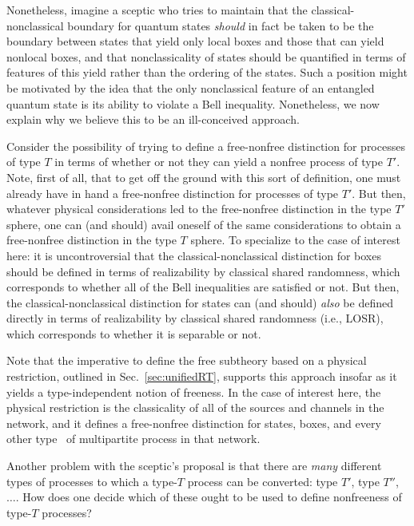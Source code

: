 \documentclass[12pt]{article}
\theoremstyle{plain}
\theoremstyle{definition}
\begin{document}
Nonetheless, imagine a sceptic who tries to maintain that the classical-nonclassical boundary for quantum states {\em should} in fact be taken to be the boundary between states that yield only local boxes and those that can yield nonlocal boxes, and that nonclassicality of states should be quantified in terms of features of this yield rather than the ordering of the states. 
Such a position might be motivated by the idea that 
the only nonclassical feature of an entangled quantum state is its ability to violate a Bell inequality. Nonetheless, we now explain why we believe this to be an ill-conceived approach.

Consider the possibility of trying to define a free-nonfree distinction for processes of type $T$ in terms of whether or not they can yield a nonfree process of type $T'$.  Note, first of all, that to get off the ground with this sort of definition, one must already have in hand a free-nonfree distinction for processes of type $T'$.  But then, whatever physical considerations led to the free-nonfree distinction in the type $T'$ sphere, one can (and should) avail oneself of the 
  same considerations to obtain a free-nonfree distinction in the type $T$ sphere. To specialize to the case of interest here: it is uncontroversial that the classical-nonclassical distinction for boxes should be defined in terms of realizability by classical shared randomness, which corresponds to whether all of the Bell inequalities are satisfied or not.  But then, the classical-nonclassical distinction for states can (and should) {\em also} be defined directly in terms of realizability by classical shared randomness (i.e., LOSR), which corresponds to whether it is separable or not. 
 
    
Note that the imperative to define 
 the free subtheory based on a physical restriction, outlined in Sec.~\ref{sec:unifiedRT}, supports this approach insofar as it yields a type-independent notion of freeness.  In the case of interest here, the physical restriction is the classicality of all of the sources and channels in the network, 
  and it defines a free-nonfree distinction for states, boxes, and every other type~\cite{semiquantum,rosset2020characterizing} of multipartite process in that network. 

Another problem with the sceptic's proposal is that there are {\em many} different types of processes to which a type-$T$ process can be converted: type $T'$, type $T''$, $\dots$.
How does one decide which of these ought to be used to define nonfreeness of type-$T$ processes?
\end{document}
